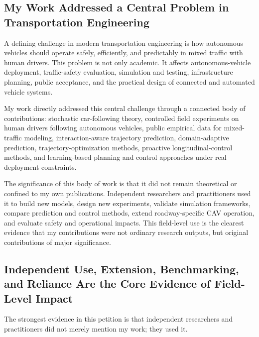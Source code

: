 \documentclass[11pt,letterpaper]{article}
\begin{document}
\subsection{My Work Addressed a Central Problem in Transportation Engineering}

A defining challenge in modern transportation engineering is how autonomous vehicles should operate safely, efficiently, and predictably in mixed traffic with human drivers. This problem is not only academic. It affects autonomous-vehicle deployment, traffic-safety evaluation, simulation and testing, infrastructure planning, public acceptance, and the practical design of connected and automated vehicle systems.

My work directly addressed this central challenge through a connected body of contributions: stochastic car-following theory, controlled field experiments on human drivers following autonomous vehicles, public empirical data for mixed-traffic modeling, interaction-aware trajectory prediction, domain-adaptive prediction, trajectory-optimization methods, proactive longitudinal-control methods, and learning-based planning and control approaches under real deployment constraints.

The significance of this body of work is that it did not remain theoretical or confined to my own publications. Independent researchers and practitioners used it to build new models, design new experiments, validate simulation frameworks, compare prediction and control methods, extend roadway-specific CAV operation, and evaluate safety and operational impacts. This field-level use is the clearest evidence that my contributions were not ordinary research outputs, but original contributions of major significance.

\subsection{Independent Use, Extension, Benchmarking, and Reliance Are the Core Evidence of Field-Level Impact}

The strongest evidence in this petition is that independent researchers and practitioners did not merely mention my work; they used it.
\end{document}
